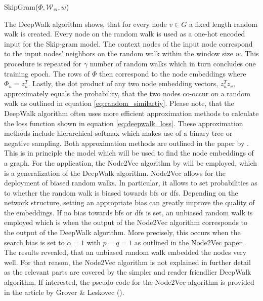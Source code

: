 	\begin{algorithm}[h]
		\scriptsize
		\SetAlgoLined
		\nl {}
		\caption[Skip-gram]{SkipGram($\Phi,\mathcal{W}_{vi},w$)}
		\label{algo:SkipGram}
	\end{algorithm}	
	
	\noindent The DeepWalk algorithm shows, that for every node $v\in G$ a
	fixed length random walk is created. Every node on the random walk is used
	as a one-hot encoded input for the Skip-gram model. The context nodes of the
	input node correspond to the input nodes' neighbors on the random walk 
	within the window size $w$. This procedure is repeated for $\gamma$ 
	number of random walks which in turn concludes one training epoch. The rows
	of $\Phi$ then correspond to the node embeddings where
	$\Phi_{u}=z_{u}^{T}$. Lastly, the dot product of any two node embedding
	vectors, $z_{u}^{T}z_{v}$, approximately equals the probability, that the
	two nodes co-occur on a random walk as outlined in equation 
	\ref{eq:random_similartiy}. Please note, that the DeepWalk algorithm often 
	uses more efficient approximation methods to calculate the loss function
	shown in equation \ref{eq:deepwalk_loss}. These approximation methods
	include hierarchical softmax which makes use of a binary tree or negative 
	sampling. Both approximation methods are outlined in the paper by 
	\cite{mikolov2013distributed}. \\

	\noindent This is in principle the model which will be used to find the node
	embeddings of a graph. For the application, the Node2Vec algorithm by
	\cite{grover2016node2vec} will be employed, which is a generalization of 
	the DeepWalk algorithm. Node2Vec allows for the deployment of biased random 
	walks. In particular, it allows to set probabilities as to whether the 
	random walk is biased towards \ac{bfs} or \ac{dfs}. Depending on the network 
	structure, setting an appropriate bias can greatly improve the quality of the 
	embeddings. If no bias towards \ac{bfs} or \ac{dfs} is set, an unbiased 
	random walk is employed which is when the output of the Node2Vec algorithm 
	corresponds to the output of the DeepWalk algorithm. More precisely, this 
	occurs when the search bias is set to $\alpha = 1$ with $p=q=1$ as outlined 
	in the Node2Vec paper \citep[p. 860]{grover2016node2vec}. The results revealed, 
	that an unbiased random walk embedded the nodes very well. For that reason, 
	the Node2Vec algorithm is not explained in further detail as the relevant 
	parts are covered by the simpler and reader friendlier DeepWalk algorithm. If
	interested, the pseudo-code for the Node2Vec algorithm is provided in the 
	article by Grover \& Leskovec (\citeyear[p. 859]{grover2016node2vec}). \\

